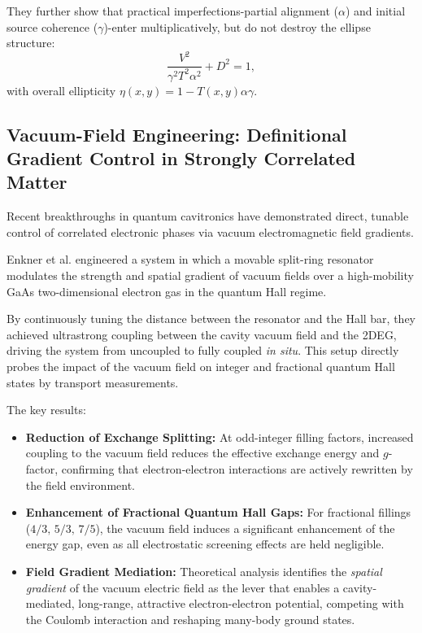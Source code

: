 They further show that practical imperfections-partial alignment ($\alpha$) and initial source coherence ($\gamma$)-enter multiplicatively, but do not destroy the ellipse structure:
\begin{equation}
\frac{V^2}{\gamma^2 T^2 \alpha^2} + D^2 = 1,
\end{equation}
with overall ellipticity $\eta(x, y) = 1 - T(x, y)\alpha\gamma$.

\subsection*{Vacuum-Field Engineering: Definitional Gradient Control in Strongly Correlated Matter}

Recent breakthroughs in quantum cavitronics have demonstrated direct, tunable control of correlated electronic phases via vacuum electromagnetic field gradients.

Enkner et al. \cite{enkner_tunable_2025} engineered a system in which a movable split-ring resonator modulates the strength and spatial gradient of vacuum fields over a high-mobility GaAs two-dimensional electron gas in the quantum Hall regime.


By continuously tuning the distance between the resonator and the Hall bar, they achieved ultrastrong coupling between the cavity vacuum field and the 2DEG, driving the system from uncoupled to fully coupled \emph{in situ}. This setup directly probes the impact of the vacuum field on integer and fractional quantum Hall states by transport measurements.

The key results:
\begin{itemize}
    \item \textbf{Reduction of Exchange Splitting:} At odd-integer filling factors, increased coupling to the vacuum field reduces the effective exchange energy and $g$-factor, confirming that electron-electron interactions are actively rewritten by the field environment.
    \item \textbf{Enhancement of Fractional Quantum Hall Gaps:} For fractional fillings ($4/3,\,5/3,\,7/5$), the vacuum field induces a significant enhancement of the energy gap, even as all electrostatic screening effects are held negligible.
    \item \textbf{Field Gradient Mediation:} Theoretical analysis identifies the \emph{spatial gradient} of the vacuum electric field as the lever that enables a cavity-mediated, long-range, attractive electron-electron potential, competing with the Coulomb interaction and reshaping many-body ground states.
\end{itemize}

